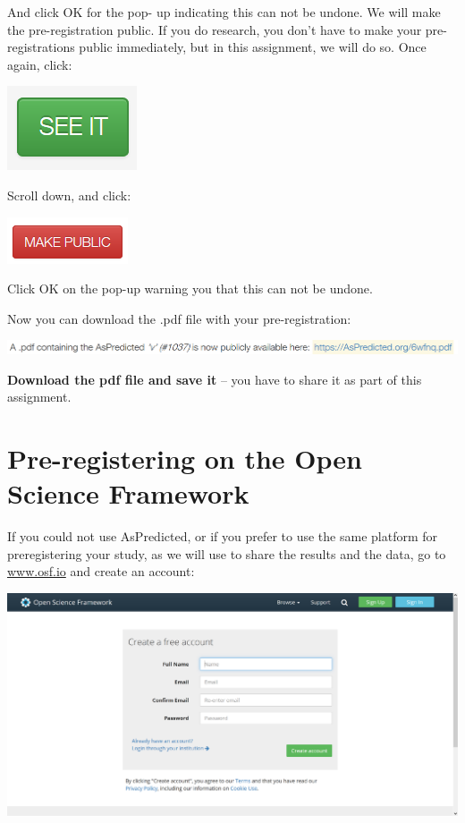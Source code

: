 \documentclass[
  oneside]{book}
\begin{document}
And click OK for the pop- up indicating this can not be undone. We will make the
pre-registration public. If you do research, you don't have to make your
pre-registrations public immediately, but in this assignment, we will do so.
Once again, click:

\begin{center}\includegraphics[width=0.2\linewidth]{images/5623f5d1b8144f8cdc09d955eaf4a3b7} \end{center}

Scroll down, and click:

\begin{center}\includegraphics[width=0.2\linewidth]{images/94a843f900ec4dcbb75f60686edac510} \end{center}

Click OK on the pop-up warning you that this can not be undone.

Now you can download the .pdf file with your pre-registration:

\begin{center}\includegraphics[width=1\linewidth]{images/87e9befad90809fbccf7be6898f5d183} \end{center}

\textbf{Download the pdf file and save it} -- you have to share it as part of this
assignment.

\hypertarget{pre-registering-on-the-open-science-framework}{%
\section{Pre-registering on the Open Science Framework}\label{pre-registering-on-the-open-science-framework}}

If you could not use AsPredicted, or if you prefer to use the same platform for preregistering your study, as we will use to share the results and the data, go to \href{http://www.osf.io}{www.osf.io} and create an account:

\begin{center}\includegraphics[width=1\linewidth]{images/7d6b26f83fee88df8bd46f30f4441844} \end{center}
\end{document}
